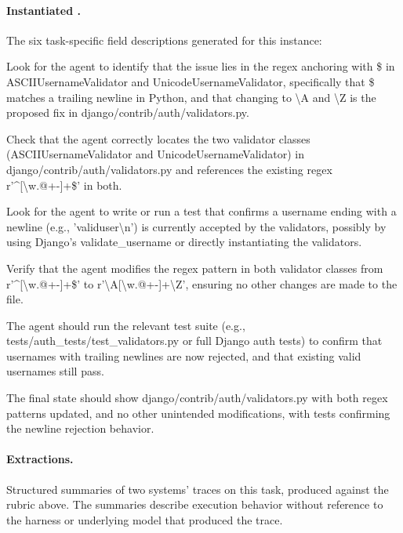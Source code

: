 \paragraph{Instantiated \trubric{}.} The six task-specific field descriptions generated for this instance:
\begin{description}[itemsep=1pt, topsep=2pt]\small
\item[understanding] Look for the agent to identify that the issue lies in the regex anchoring with \$ in ASCIIUsernameValidator and UnicodeUsernameValidator, specifically that \$ matches a trailing newline in Python, and that changing to \textbackslash{}A and \textbackslash{}Z is the proposed fix in django/contrib/auth/validators.py.
\item[localization] Check that the agent correctly locates the two validator classes (ASCIIUsernameValidator and UnicodeUsernameValidator) in django/contrib/auth/validators.py and references the existing regex r'\textasciicircum{}[\textbackslash{}w.@+-]+\$' in both.
\item[reproduction] Look for the agent to write or run a test that confirms a username ending with a newline (e.g., 'validuser\textbackslash{}n') is currently accepted by the validators, possibly by using Django's validate\_username or directly instantiating the validators.
\item[editing] Verify that the agent modifies the regex pattern in both validator classes from r'\textasciicircum{}[\textbackslash{}w.@+-]+\$' to r'\textbackslash{}A[\textbackslash{}w.@+-]+\textbackslash{}Z', ensuring no other changes are made to the file.
\item[verification] The agent should run the relevant test suite (e.g., tests/auth\_tests/test\_validators.py or full Django auth tests) to confirm that usernames with trailing newlines are now rejected, and that existing valid usernames still pass.
\item[final state] The final state should show django/contrib/auth/validators.py with both regex patterns updated, and no other unintended modifications, with tests confirming the newline rejection behavior.
\end{description}

\paragraph{Extractions.} Structured summaries of two systems' traces on this task, produced against the rubric above. The summaries describe execution behavior without reference to the harness or underlying model that produced the trace.

